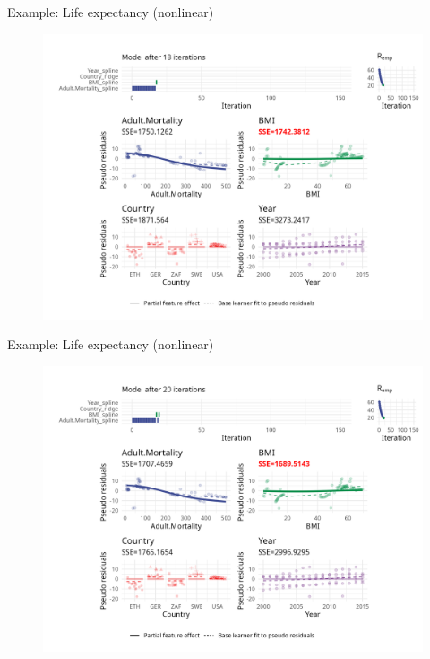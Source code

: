 \begin{frame}{Example: Life expectancy (nonlinear)}
	\begin{figure}
		\centering
		\includegraphics[width=\textwidth]{figures/cwb-anim/fig-iter-0018.png}
	\end{figure}
	\addtocounter{framenumber}{-1}
\end{frame}


\begin{frame}{Example: Life expectancy (nonlinear)}
	\begin{figure}
		\centering
		\includegraphics[width=\textwidth]{figures/cwb-anim/fig-iter-0020.png}
	\end{figure}
	\addtocounter{framenumber}{-1}
\end{frame}


